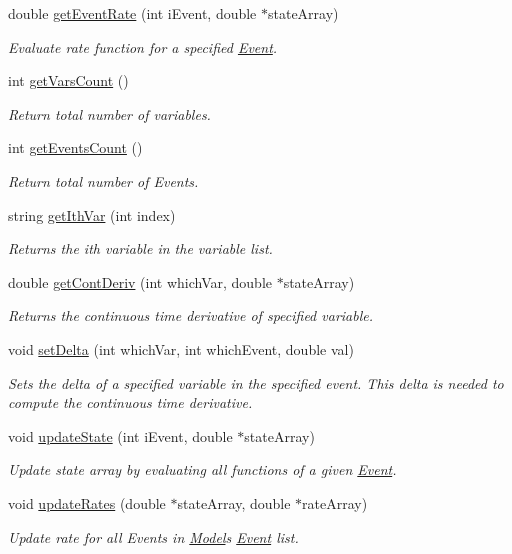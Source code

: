 \begin{DoxyCompactItemize}
double \hyperlink{class_model_a2909caddddccca90faaae708e68226ad}{get\+Event\+Rate} (int i\+Event, double $\ast$state\+Array)
\begin{DoxyCompactList}\small\item\em Evaluate rate function for a specified \hyperlink{class_event}{Event}. \end{DoxyCompactList}\item 
int \hyperlink{class_model_ae8b56a284c355ff18421174d078dc870}{get\+Vars\+Count} ()
\begin{DoxyCompactList}\small\item\em Return total number of variables. \end{DoxyCompactList}\item 
int \hyperlink{class_model_adc48dad5a02caa940aaffee7e8377682}{get\+Events\+Count} ()
\begin{DoxyCompactList}\small\item\em Return total number of Events. \end{DoxyCompactList}\item 
string \hyperlink{class_model_adcb9dcc2d1d58f18d595f1476fc77b3b}{get\+Ith\+Var} (int index)
\begin{DoxyCompactList}\small\item\em Returns the ith variable in the variable list. \end{DoxyCompactList}\item 
double \hyperlink{class_model_a6c6960f2621f8ddc441c0f3440052971}{get\+Cont\+Deriv} (int which\+Var, double $\ast$state\+Array)
\begin{DoxyCompactList}\small\item\em Returns the continuous time derivative of specified variable. \end{DoxyCompactList}\item 
void \hyperlink{class_model_a007d1420536d6e53aa253b6106875148}{set\+Delta} (int which\+Var, int which\+Event, double val)
\begin{DoxyCompactList}\small\item\em Sets the delta of a specified variable in the specified event. This delta is needed to compute the continuous time derivative. \end{DoxyCompactList}\item 
void \hyperlink{class_model_ad9e7a181a31a2a9fab052d11b1984afd}{update\+State} (int i\+Event, double $\ast$state\+Array)
\begin{DoxyCompactList}\small\item\em Update state array by evaluating all functions of a given \hyperlink{class_event}{Event}. \end{DoxyCompactList}\item 
void \hyperlink{class_model_a3f2fd71261c87162718864d7efc67f2f}{update\+Rates} (double $\ast$state\+Array, double $\ast$rate\+Array)
\begin{DoxyCompactList}\small\item\em Update rate for all Events in \hyperlink{class_model}{Model}\textquotesingle{}s \hyperlink{class_event}{Event} list. \end{DoxyCompactList}\end{DoxyCompactItemize}
